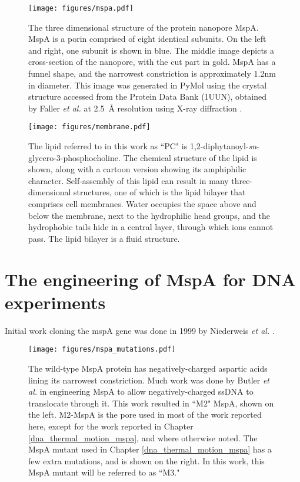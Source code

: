 \begin{figure}[h]
\begin{centering}
\texttt{[image: figures/mspa.pdf]}
\caption[The protein nanopore MspA]{The three dimensional structure of the protein nanopore MspA.  MspA is a porin comprised of eight identical subunits.  On the left and right, one subunit is shown in blue.  The middle image depicts a cross-section of the nanopore, with the cut part in gold.  MspA has a funnel shape, and the narrowest constriction is approximately 1.2nm in diameter.  This image was generated in PyMol using the crystal structure accessed from the Protein Data Bank (1UUN), obtained by Faller \textit{et al.} at \SI{2.5}{\angstrom} resolution using X-ray diffraction \citep{Faller2004a}.}
\label{fig:mspa}
\end{centering}
\end{figure}

\begin{figure}[h]
\begin{centering}
\texttt{[image: figures/membrane.pdf]}
\caption[Lipids and the lipid bilayer membrane]{The lipid referred to in this work as ``PC" is 1,2-diphytanoyl-\textit{sn}-glycero-3-phosphocholine.  The chemical structure of the lipid is shown, along with a cartoon version showing its amphiphilic character.  Self-assembly of this lipid can result in many three-dimensional structures, one of which is the lipid bilayer that comprises cell membranes.  Water occupies the space above and below the membrane, next to the hydrophilic head groups, and the hydrophobic tails hide in a central layer, through which ions cannot pass.  The lipid bilayer is a fluid structure.}
\label{fig:lipids}
\end{centering}
\end{figure}

\section{The engineering of MspA for DNA experiments}

Initial work cloning the mspA gene was done in 1999 by Niederweis \textit{et al.} \citep{Niederweis1999}.

\begin{figure}[h]
\begin{centering}
\texttt{[image: figures/mspa\_mutations.pdf]}
\caption[Genetic engineering of MspA]{The wild-type MspA protein has negatively-charged aspartic acids lining its narrowest constriction.  Much work was done by Butler \textit{et al.} \citep{Butler2008} in engineering MspA to allow negatively-charged ssDNA to translocate through it.  This work resulted in ``M2" MspA, shown on the left.  M2-MspA is the pore used in most of the work reported here, except for the work reported in Chapter \ref{dna_thermal_motion_mspa}, and where otherwise noted.  The MspA mutant used in Chapter \ref{dna_thermal_motion_mspa} has a few extra mutations, and is shown on the right.  In this work, this MspA mutant will be referred to as ``M3."}
\label{fig:mspa_engineering}
\end{centering}
\end{figure}

